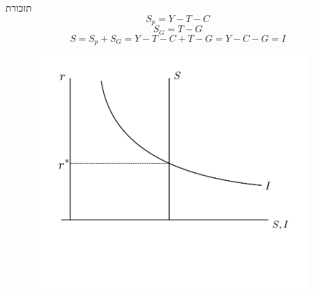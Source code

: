 \documentclass[usenames,dvipsnames]{beamer}
\begin{document}
\begin{RTL}
\begin{frame}[allowframebreaks]
        \framebreak
        \begin{block}{תזכורת}
            $$S_p = Y - T - C$$
            $$S_G = T - G$$
            $$S = S_p + S_G = Y - T - C + T - G = Y - C - G = I$$
        \end{block}
        \begin{figure}
            \begin{small}
                \begin{center}
                    \includegraphics[width=0.95\textwidth]{WhatsApp Image 2024-02-10 at 23.34.52.jpeg}
                \end{center}
                \caption{}
                \label{fig:}
            \end{small}
        \end{figure}
        
    
    \end{frame}
\end{RTL}
\end{document}
